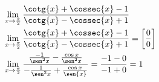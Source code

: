 \begin{ex}
\begin{align}
&\lim_{x\rightarrow \frac{\pi}{2}} \frac{\cotg{x}+\cossec{x}-1}{\cotg{x}-\cossec{x}+1}\nonumber\\
&\lim_{x\rightarrow \frac{\pi}{2}} \frac{\cotg{x}+\cossec{x}-1}{\cotg{x}-\cossec{x}+1}=\left[\frac{0}{0}\right]\nonumber\\
&\lim_{x\rightarrow \frac{\pi}{2}} \frac{\frac{-1}{\sen^2{x}}-\frac{\cos{x}}{\sen^2{x}}}{-\frac{1}{\sen^2{x}}+\frac{\cos{x}}{\sen{x}}}=\frac{-1-0}{-1+0}=1\nonumber
\end{align}
\end{ex}